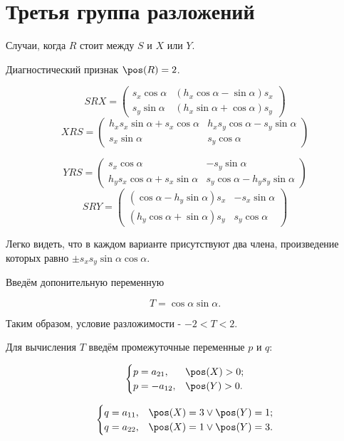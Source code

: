 \section{Третья группа разложений}

Случаи, когда $R$ стоит между $S$ и $X$ или $Y$.

Диагностический признак $\pos(R)=2$.

$$SRX = 
\begin{pmatrix}
	{s_x}\cos\alpha  & \left({h_x} \cos\alpha -\sin\alpha\right)  {s_x}\\
	{s_y}\sin\alpha  & \left({h_x} \sin\alpha +\cos\alpha\right)  {s_y}
\end{pmatrix}
$$
$$XRS = \begin{pmatrix}
	{h_x} {s_x} \sin\alpha + {s_x} \cos\alpha & {h_x} {s_y} \cos\alpha-{s_y} \sin\alpha\\
	{s_x} \sin\alpha & {s_y} \cos\alpha
\end{pmatrix}$$

$$YRS = \begin{pmatrix}
{s_x} \cos\alpha & -{s_y} \sin\alpha\\
{h_y} {s_x} \cos\alpha+{s_x} \sin\alpha & {s_y} \cos\alpha-{h_y} {s_y} \sin\alpha
\end{pmatrix}$$
$$SRY =
\begin{pmatrix}
\left( \cos\alpha-{h_y} \sin\alpha\right)  {s_x} & -{s_x} \sin\alpha\\
\left( {h_y} \cos\alpha+\sin\alpha\right)  {s_y} & {s_y} \cos\alpha
\end{pmatrix}
$$

Легко видеть, что в каждом варианте присутствуют два члена, произведение которых равно $\pm s_x s_y \sin\alpha \cos\alpha$.

Введём допонительную переменную

$$T = \cos\alpha\sin\alpha.$$

Таким образом, условие разложимости - $-2<T<2$. 

Для вычисления $T$ введём промежуточные переменные $p$ и $q$:

$$\begin{cases}
	p = a_{21}, & \pos(X)>0;\\
	p = -a_{12}, & \pos(Y)>0.
\end{cases}$$

$$\begin{cases}
	q = a_{11}, & \pos(X)=3 \vee \pos(Y)=1;\\
	q = a_{22}, & \pos(X)=1 \vee \pos(Y)=3.
\end{cases}$$


